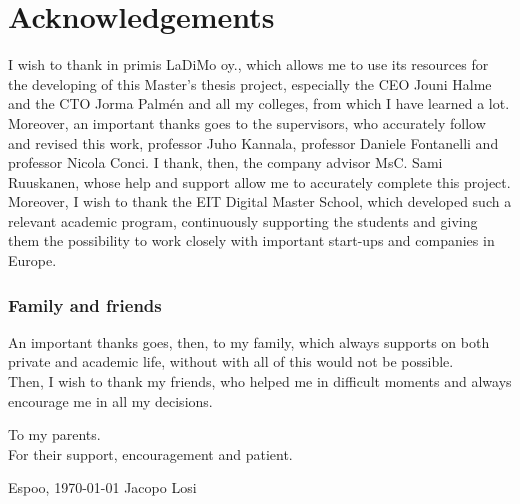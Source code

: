\documentclass[12pt,a4paper,oneside,pdftex]{report}
\newcommand{\DATE}{\today}
\newcommand{\AUTHOR}{Jacopo Losi}
\begin{document}

\chapter*{Acknowledgements}

I wish to thank in primis LaDiMo oy., which allows me to use its resources for the developing of this Master's thesis project, especially the CEO Jouni Halme and the CTO Jorma Palmén and all my colleges, from which I have learned a lot.
Moreover, an important thanks goes to the supervisors, who accurately follow and revised this work, professor Juho Kannala, professor Daniele Fontanelli and professor Nicola Conci.
I thank, then, the company advisor MsC. Sami Ruuskanen, whose help and support allow me to accurately complete this project.\\
Moreover, I wish to thank the EIT Digital Master School, which developed such a relevant academic program, continuously supporting the students and giving them the possibility to work closely with important start-ups and companies in Europe.

\subsection*{Family and friends}
An important thanks goes, then, to my family, which always supports on both private and academic life, without with all of this would not be possible.\\
Then, I wish to thank my friends, who helped me in difficult moments and always encourage me in all my decisions.\\

\begin{flushright}
To my parents.\\
For their support, encouragement and patient. 
\end{flushright} 

\vfill

\noindent Espoo, \DATE
\vskip 5mm
\noindent\AUTHOR

\cleardoublepage

\end{document}
